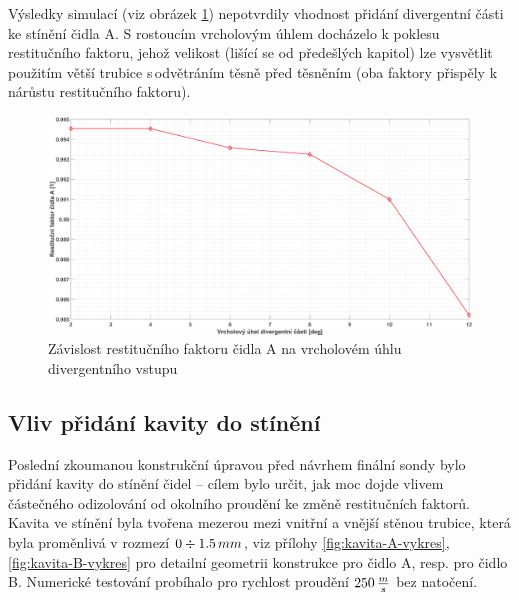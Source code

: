         Výsledky simulací (viz obrázek \ref{fig:divergentni-cast-A}) nepotvrdily vhodnost přidání divergentní části ke stínění čidla A. S rostoucím vrcholovým úhlem docházelo k poklesu restitučního faktoru, jehož velikost (lišící se od předešlých kapitol) lze vysvětlit použitím větší trubice s\,odvětráním těsně před těsněním (oba faktory přispěly k nárůstu restitučního faktoru).
    
        \begin{figure}[ht!]
            \centering
            \includegraphics*[width=\textwidth]{400_SIMULACE_KONSTRUKCNICH_UPRAV/Grafy/08_divergentni_cast_A.eps}
            \caption{Závislost restitučního faktoru čidla A na vrcholovém úhlu divergentního vstupu}
            \label{fig:divergentni-cast-A}
        \end{figure}
    
    \newpage
    \subsection{Vliv přidání kavity do stínění} \label{sec:kavita}
        Poslední zkoumanou konstrukční úpravou před návrhem finální sondy bylo přidání kavity do stínění čidel – cílem bylo určit, jak moc dojde vlivem částečného odizolování od okolního proudění ke změně restitučních faktorů. Kavita ve stínění byla tvořena mezerou mezi vnitřní a vnější stěnou trubice, která byla proměnlivá v rozmezí \linebreak $0 \div 1.5 \, mm$, viz přílohy \ref{fig:kavita-A-vykres}, \ref{fig:kavita-B-vykres} pro detailní geometrii konstrukce pro čidlo A, resp. pro čidlo B. Numerické testování probíhalo pro rychlost proudění $250 \, \frac{m}{s}$ bez natočení.

